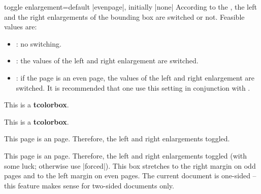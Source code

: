 \clearpage
\begin{docTcbKey}{toggle enlargement}{=}{default |evenpage|, initially |none|}
  According to the , the left and the right enlargements of
  the bounding box are switched or not. Feasible values are:
  \begin{itemize}
  \item{}: no switching.
  \item{}: the values of the left and right enlargement are switched.
  \item{}: if the page is an even page, the values of the left and
    right enlargement are switched. It is recommended that one use this setting in
    conjunction with .
  \end{itemize}
\begin{dispExample}

\begin{tcolorbox}[toggle enlargement=none,enhanced,show bounding box]
This is a \textbf{tcolorbox}.
\end{tcolorbox}
\begin{tcolorbox}[toggle enlargement=forced]
This is a \textbf{tcolorbox}.
\end{tcolorbox}
\begin{tcolorbox}[toggle enlargement=evenpage,check odd page]
  This page is an  page.
  Therefore, the left and right enlargements
   toggled.
\end{tcolorbox}
\end{dispExample}

\begin{dispListing}
\begin{tcolorbox}[colframe=red!60!black,colback=red!15!white,check odd page,
  fonttitle=\bfseries,title=Floating box from \texttt{toggle enlargement},
  width=\textwidth,grow to right by=2cm,toggle enlargement=evenpage,float=t]
  This page is an  page.
  Therefore, the left and right enlargements
   toggled (with some luck; otherwise
  use |forced|). This box stretches to the right margin on odd pages and to the left
  margin on even pages. The current document is one-sided -- this feature makes
  sense for two-sided documents only.
\end{tcolorbox}
\end{dispListing}
\tcbusetemp
\end{docTcbKey}


